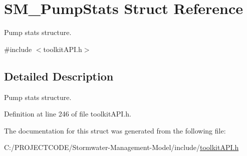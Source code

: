 \hypertarget{struct_s_m___pump_stats}{}\section{S\+M\+\_\+\+Pump\+Stats Struct Reference}
\label{struct_s_m___pump_stats}


Pump stats structure.  




{\ttfamily \#include $<$toolkit\+A\+P\+I.\+h$>$}



\subsection{Detailed Description}
Pump stats structure. 

Definition at line 246 of file toolkit\+A\+P\+I.\+h.



The documentation for this struct was generated from the following file\+:\begin{DoxyCompactItemize}
\item 
C\+:/\+P\+R\+O\+J\+E\+C\+T\+C\+O\+D\+E/\+Stormwater-\/\+Management-\/\+Model/include/\hyperlink{toolkit_a_p_i_8h}{toolkit\+A\+P\+I.\+h}\end{DoxyCompactItemize}
